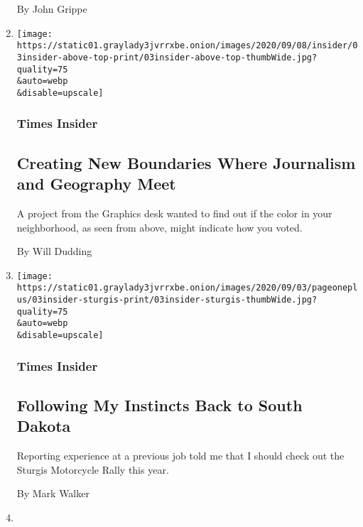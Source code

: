 \begin{enumerate}
  By John Grippe
\item
  \href{/2020/09/04/insider/journalism-and-geography.html}{}

  \texttt{[image: https://static01.graylady3jvrrxbe.onion/images/2020/09/08/insider/03insider-above-top-print/03insider-above-top-thumbWide.jpg?quality=75\\\&auto=webp\\\&disable=upscale]}

  \hypertarget{times-insider-6}{%
  \subsubsection{Times Insider}\label{times-insider-6}}

  \hypertarget{creating-new-boundaries-where-journalism-and-geography-meet}{%
  \subsection{Creating New Boundaries Where Journalism and Geography
  Meet}\label{creating-new-boundaries-where-journalism-and-geography-meet}}

  A project from the Graphics desk wanted to find out if the color in
  your neighborhood, as seen from above, might indicate how you voted.

  By Will Dudding
\item
  \href{/2020/09/03/insider/south-dakota-rally-coverage.html}{}

  \texttt{[image: https://static01.graylady3jvrrxbe.onion/images/2020/09/03/pageoneplus/03insider-sturgis-print/03insider-sturgis-thumbWide.jpg?quality=75\\\&auto=webp\\\&disable=upscale]}

  \hypertarget{times-insider-7}{%
  \subsubsection{Times Insider}\label{times-insider-7}}

  \hypertarget{following-my-instincts-back-to-south-dakota}{%
  \subsection{Following My Instincts Back to South
  Dakota}\label{following-my-instincts-back-to-south-dakota}}

  Reporting experience at a previous job told me that I should check out
  the Sturgis Motorcycle Rally this year.

  By Mark Walker
\item
  \href{/2020/09/02/insider/food-insecurity-families.html}{}


\end{enumerate}
